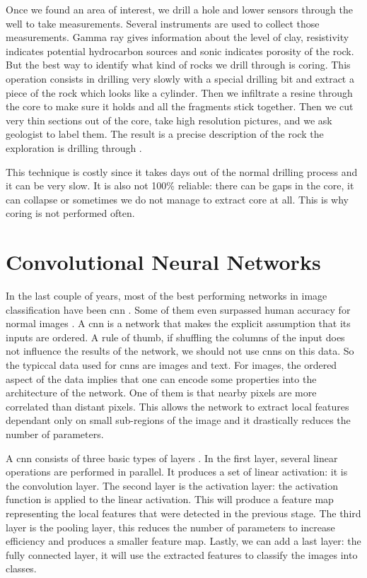 Once we found an area of interest, we drill a hole and lower sensors through the well to take measurements. Several instruments are used to collect those measurements.  Gamma ray gives information about the level of clay, resistivity indicates potential hydrocarbon sources and sonic indicates porosity of the rock. But the best way to identify what kind of rocks we drill through is coring. This operation consists in drilling very slowly with a special drilling bit and extract a piece of the rock which looks like a cylinder. Then we infiltrate a resine through the core to make sure it holds and all the fragments stick together. Then we cut very thin sections out of the core, take high resolution pictures, and we ask geologist to label them. The result is a precise description of the rock the exploration is drilling through \cite{oilbegin}.  

This technique is costly since it takes days out of the normal drilling process and it can be very slow. It is also not 100\% reliable: there can be gaps in the core, it can collapse or sometimes we do not manage to extract core at all. This is why coring is not performed often. 

\section{Convolutional Neural Networks}
In the last couple of years, most of the best performing networks in image classification have been \gls{cnn} \cite{resnetpaper, alexpaper, googlepaper}. Some of them even surpassed human accuracy for normal images \cite{humanDNN}.
A \gls{cnn} is a network that makes the explicit assumption that its inputs are ordered. A rule of thumb, if shuffling the columns of the input does not influence the results of the network, we should not use \gls{cnn}s on this data. So the typiccal data used for \gls{cnn}s are images and text. 
For images, the ordered aspect of the data implies that one can encode some properties into the architecture of the network. One of them is that nearby pixels are more correlated than distant pixels. This allows the network to extract local features dependant only on small sub-regions of the image and it drastically reduces the number of parameters. 


A \gls{cnn} consists of three basic types of layers \cite{deepbook}.  In the first layer, several linear operations are performed in parallel. It produces a set of linear activation: it is the convolution layer. The second layer is the activation layer: the activation function is applied to the linear activation. This will produce a feature map representing the local features that were detected in the previous stage. The third layer is the pooling layer, this reduces the number of parameters to increase efficiency and produces a smaller feature map. Lastly, we can add a last layer: the fully connected layer, it will use the extracted features to classify the images into classes.


